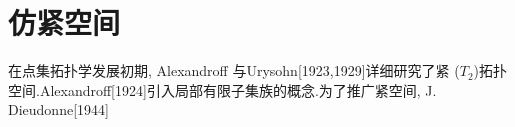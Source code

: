 \documentclass[main.tex]{subfiles}
\begin{document}
\section{仿紧空间}\label{ch2.3}
在点集拓扑学发展初期, Alexandroff 与Urysohn[1923,1929]详细研究了紧
($T_2$)拓扑空间.Alexandroff[1924]引入局部有限子集族的概念.为了推广紧空间, J. Dieudonne[1944]
	
\end{document}
